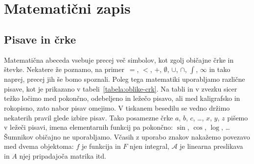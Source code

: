 







\section{Matematični zapis}
\label{sec:matematicni-zapis}

\subsection{Pisave in črke}
\label{sec:pisave-in-crke}


Matematična abeceda vsebuje precej več simbolov, kot zgolj običajne črke in števke. Nekatere že poznamo, na primer~$=$, $<$, $+$, $\emptyset$, $\cup$, $\cap$, $\int$, $\infty$ in tako naprej, precej jih še bomo spoznali. Poleg tega matematiki uporabljamo različne pisave, kot je prikazano v tabeli~\ref{tabela:oblike-crk}. Na tabli in v zvezku sicer težko ločimo med pokončno, odebeljeno in ležečo pisavo, ali med kaligrafsko in rokopisno, zato nabor pisav omejimo. V tiskanem besedilu se vedno držimo nekaterih pravil glede izbire pisav. Tako posamezne črke $a$, $b$, $c$, \dots, $x$, $y$, $z$ pišemo v ležeči pisavi, imena elementarnih funkcij pa pokončno: $\sin$, $\cos$, $\log$, \ldots Šumnikov običajno ne uporabljamo. Včasih z uporabo znakov nakažemo povezavo med dvema objektoma: $f$ je funkcija in $F$ njen integral, $\mathcal{A}$ je linearna preslikava in $A$ njej pripadajoča matrika itd.

